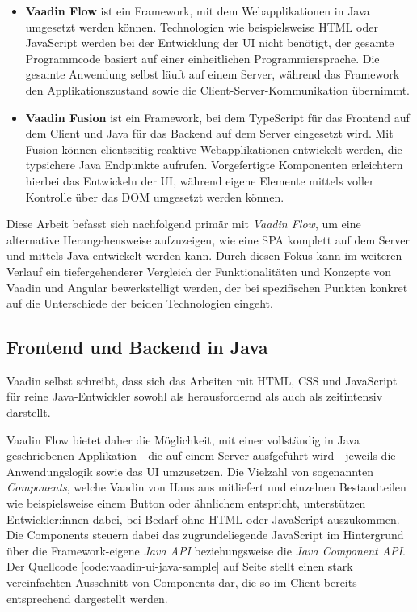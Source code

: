 \documentclass[a4paper,12pt,twoside]{scrreprt}
\begin{document}
\begin{itemize}
    \item \textbf{Vaadin Flow} ist ein Framework, mit dem Webapplikationen in Java umgesetzt werden können. Technologien wie beispielsweise HTML oder JavaScript werden bei der Entwicklung der \acs{UI} nicht benötigt, der gesamte Programmcode basiert auf einer einheitlichen Programmiersprache. Die gesamte Anwendung selbst läuft auf einem Server, während das Framework den Applikationszustand sowie die Client-Server-Kommunikation übernimmt.  \parencite[][]{vaadin_ltd_vaadin_nodate}
    \item \textbf{Vaadin Fusion} ist ein Framework, bei dem TypeScript für das Frontend auf dem Client und Java für das Backend auf dem Server eingesetzt wird. Mit Fusion können clientseitig reaktive Webapplikationen entwickelt werden, die typsichere Java Endpunkte aufrufen. Vorgefertigte Komponenten erleichtern hierbei das Entwickeln der \acs{UI}, während eigene Elemente mittels voller Kontrolle über das \ac{DOM} umgesetzt werden können. \parencite[][]{vaadin_ltd_vaadin_nodate-1}
\end{itemize}

Diese Arbeit befasst sich nachfolgend primär mit \textit{Vaadin Flow}, um eine alternative Herangehensweise aufzuzeigen, wie eine \ac{SPA} komplett auf dem Server und mittels Java entwickelt werden kann. Durch diesen Fokus kann im weiteren Verlauf ein tiefergehenderer Vergleich der Funktionalitäten und Konzepte von Vaadin und Angular bewerkstelligt werden, der bei spezifischen Punkten konkret auf die Unterschiede der beiden Technologien eingeht.

\subsection{Frontend und Backend in Java}
\label{sub-sec:frontend-backend-java}
Vaadin selbst schreibt, dass sich das Arbeiten mit HTML, \ac{CSS} und JavaScript für reine Java-Entwickler sowohl als herausfordernd als auch als zeitintensiv darstellt. \parencite[][Framework - Introduction - Overview]{vaadin_ltd_documentation_nodate}

Vaadin Flow bietet daher die Möglichkeit, mit einer vollständig in Java geschriebenen Applikation - die auf einem Server ausfgeführt wird - jeweils die Anwendungslogik sowie das \acl{UI} umzusetzen. Die Vielzahl von sogenannten \textit{Components}, welche Vaadin von Haus aus mitliefert und einzelnen Bestandteilen wie beispielsweise einem Button oder ähnlichem entspricht, unterstützen Entwickler:innen dabei, bei Bedarf ohne HTML oder JavaScript auszukommen. Die Components steuern dabei das zugrundeliegende JavaScript im Hintergrund über die Framework-eigene \textit{Java API} beziehungsweise die \textit{Java Component API}. Der Quellcode \ref{code:vaadin-ui-java-sample} auf Seite \pageref{code:vaadin-ui-java-sample} stellt einen stark vereinfachten Ausschnitt von Components dar, die so im Client bereits entsprechend dargestellt werden. \parencite[][Framework - Introduction - Overview]{vaadin_ltd_documentation_nodate}
\end{document}
